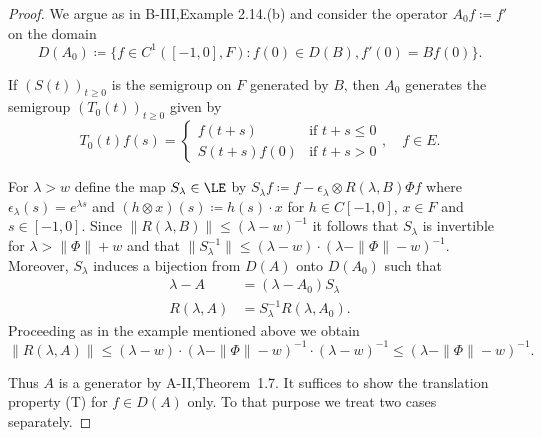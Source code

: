 \begin{proof} We argue as in B-III,Example 2.14.(b) and consider the operator $A_{0}f  \coloneq  f'$ on the domain 
\[D(A_{0})  \coloneq  \{f \in C^1([-1,0],F) \colon f(0) \in D(B), f'(0) = Bf(0)\}.\]

If $(S(t))_{t\geq 0}$ is the semigroup on $F$ generated by $B$, then $A_{0}$ generates the semigroup $(T_{0}(t))_{t\geq 0}$ given by
\[T_{0}(t)f(s) = \begin{cases}
	f(t+s) & \text{if } t+s \leq 0 \\
	S(t+s)f(0) & \text{if } t+s  >  0
\end{cases}, \quad f \in E.\]

For $\lambda  >  w$ define the map $S_{\lambda} \in \LE$ by $S_{\lambda}f  \coloneq  f - \epsilon_{\lambda}\otimes R(\lambda,B)\Phi f$ where $\epsilon_{\lambda}(s) = e^{\lambda s}$ and $(h\otimes x)(s)  \coloneq  h(s)\cdot x$ for $h \in C[-1,0]$, $x \in F$ and $s \in [-1,0]$.
Since $\|R(\lambda,B)\| \leq (\lambda-w)^{-1}$ it follows that $S_{\lambda}$ is invertible for $\lambda  >  \|\Phi\| + w$ and that $\|S_{\lambda}^{-1}\| \leq (\lambda-w)\cdot(\lambda-\|\Phi\|-w)^{-1}$.
Moreover, $S_{\lambda}$ induces a bijection from $D(A)$ onto $D(A_{0})$ such that
\begin{equation}\label{eq:b4-3.2}
	\begin{aligned}
		\lambda - A &= (\lambda - A_{0})S_{\lambda} \\
		R(\lambda,A) &= S_{\lambda}^{-1}R(\lambda,A_{0}).
	\end{aligned}
\end{equation}
Proceeding as in the example mentioned above we obtain
\[\|R(\lambda,A)\| \leq (\lambda - w)\cdot(\lambda - \|\Phi\| - w)^{-1}\cdot(\lambda - w)^{-1} \leq (\lambda - \|\Phi\| - w)^{-1}.\]

Thus $A$ is a generator by A-II,Theorem~1.7.
%
%
\newpage
%
It suffices to show the translation property (T) for $f \in D(A)$ only.
To that purpose we treat two cases separately.


\end{proof}
